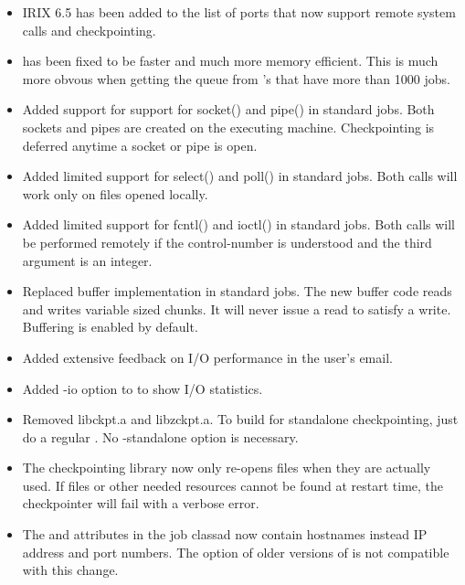 \begin{itemize}

\item IRIX 6.5 has been added to the list of ports that now support
remote system calls and checkpointing.

\item {} has been fixed to be faster and much more memory
efficient.  This is much more obvous when getting the queue from
's that have more than 1000 jobs.

\item Added support for support for socket() and pipe() in standard
jobs.  Both sockets and pipes are created on the executing machine.
Checkpointing is deferred anytime a socket or pipe is open.

\item Added limited support for select() and poll() in standard jobs.
Both calls will work only on files opened locally.

\item Added limited support for fcntl() and ioctl() in standard jobs.
Both calls will be performed remotely if the control-number is understood
and the third argument is an integer.

\item Replaced buffer implementation in standard jobs.
The new buffer code reads and writes variable sized chunks.
It will never issue a read to satisfy a write.  Buffering is enabled
by default.

\item Added extensive feedback on I/O performance in the user's email.

\item Added -io option to  to show I/O statistics.

\item Removed libckpt.a and libzckpt.a.  To build for standalone
checkpointing, just do a regular .
No -standalone option is necessary.

\item The checkpointing library now only re-opens files when they are
actually used.  If files or other needed resources cannot be found
at restart time, the checkpointer will fail with a verbose error.

\item The  and  attributes in
the job classad now contain hostnames instead IP address and port
numbers.  The  option of older versions of  is not
compatible with this change.

\end{itemize}

